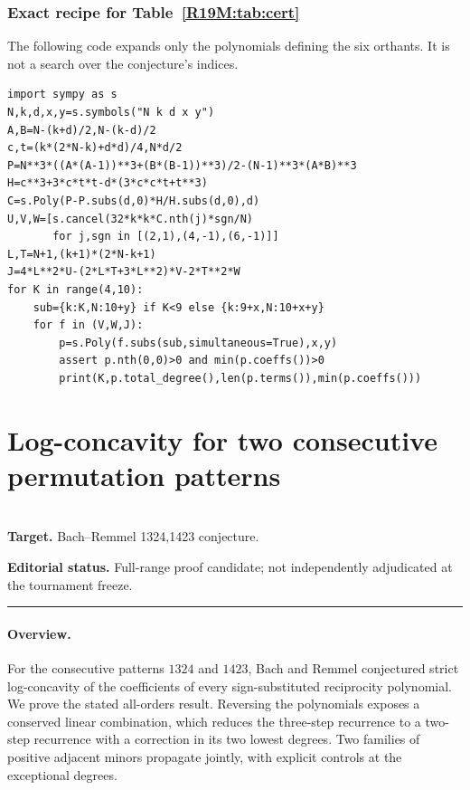 \documentclass[11pt,a4paper]{article}
\begin{document}
\subsubsection*{Exact recipe for Table~\ref{R19M:tab:cert}}
The following code expands only the polynomials defining the six
orthants. It is not a search over the conjecture's indices.
\begin{Verbatim}[fontsize=\footnotesize,breaklines,breakanywhere]
import sympy as s
N,k,d,x,y=s.symbols("N k d x y")
A,B=N-(k+d)/2,N-(k-d)/2
c,t=(k*(2*N-k)+d*d)/4,N*d/2
P=N**3*((A*(A-1))**3+(B*(B-1))**3)/2-(N-1)**3*(A*B)**3
H=c**3+3*c*t*t-d*(3*c*c*t+t**3)
C=s.Poly(P-P.subs(d,0)*H/H.subs(d,0),d)
U,V,W=[s.cancel(32*k*k*C.nth(j)*sgn/N)
       for j,sgn in [(2,1),(4,-1),(6,-1)]]
L,T=N+1,(k+1)*(2*N-k+1)
J=4*L**2*U-(2*L*T+3*L**2)*V-2*T**2*W
for K in range(4,10):
    sub={k:K,N:10+y} if K<9 else {k:9+x,N:10+x+y}
    for f in (V,W,J):
        p=s.Poly(f.subs(sub,simultaneous=True),x,y)
        assert p.nth(0,0)>0 and min(p.coeffs())>0
        print(K,p.total_degree(),len(p.terms()),min(p.coeffs()))
\end{Verbatim}
\endgroup


\clearpage

\section{Log-concavity for two consecutive permutation patterns}
\label{section:R20T}
\\[3pt]
\noindent\textbf{Target.} Bach--Remmel {1324,1423} conjecture.

\noindent\textbf{Editorial status.} Full-range proof candidate; not independently adjudicated at the tournament freeze. 

\smallskip\hrule\medskip



\begingroup
\newcommand{\GG}{\Gamma}
\setcounter{equation}{0}
\renewcommand{\theequation}{\thesection.\arabic{equation}}
\renewcommand{\theHequation}{R20T.\arabic{equation}}
\paragraph{Overview.}
For the consecutive patterns $1324$ and $1423$, Bach and Remmel conjectured strict log-concavity of the coefficients of every sign-substituted reciprocity polynomial. We prove the stated all-orders result. Reversing the polynomials exposes a conserved linear combination, which reduces the three-step recurrence to a two-step recurrence with a correction in its two lowest degrees. Two families of positive adjacent minors propagate jointly, with explicit controls at the exceptional degrees.
\end{document}
